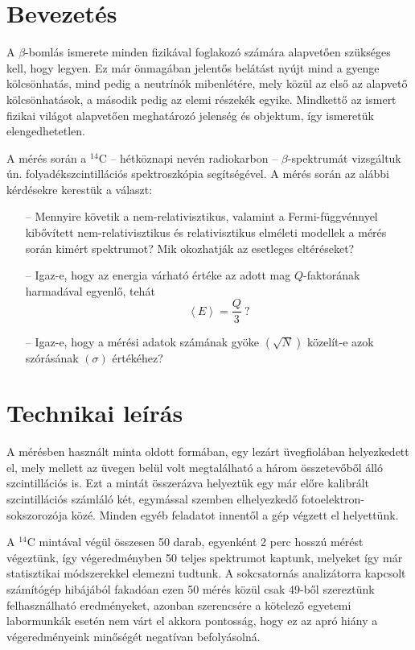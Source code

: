 \begin{multicols}{2}
\section{Bevezetés}
A $\beta$-bomlás ismerete minden fizikával foglakozó számára alapvetően szükséges kell, hogy legyen. Ez már önmagában jelentős belátást nyújt mind a gyenge kölcsönhatás, mind pedig a neutrínók mibenlétére, mely közül az első az alapvető kölcsönhatások, a második pedig az elemi részekék egyike. Mindkettő az ismert fizikai világot alapvetően meghatározó jelenség és objektum, így ismeretük elengedhetetlen. \par
A mérés során a $^{14}$C -- hétköznapi nevén radiokarbon -- $\beta$-spektrumát vizsgáltuk ún. folyadékszcintillációs spektroszkópia segítségével. A mérés során az alábbi kérdésekre kerestük a választ:
\begin{itemize}
\item[--] Mennyire követik a nem-relativisztikus, valamint a Fermi-függvénnyel kibővített nem-relativisztikus és relativisztikus elméleti modellek a mérés során kimért spektrumot? Mik okozhatják az esetleges eltéréseket?
\item[--] Igaz-e, hogy az energia várható értéke az adott mag $Q$-faktorának harmadával egyenlő, tehát
	\begin{equation*}
	\left< E \right> = \frac{Q}{3}\ \text{?}
	\end{equation*}
\item[--] Igaz-e, hogy a mérési adatok számának gyöke $\left( \sqrt{N} \right)$ közelít-e azok szórásának $\left( \sigma \right)$ értékéhez?
\end{itemize}

\section{Technikai leírás}
A mérésben használt minta oldott formában, egy lezárt üvegfiolában helyezkedett el, mely mellett az üvegen belül volt megtalálható a három összetevőből álló szcintillációs  is. Ezt a mintát összerázva helyeztük egy már előre kalibrált szcintillációs számláló két, egymással szemben elhelyezkedő fotoelektron-sokszorozója közé. Minden egyéb feladatot innentől a gép végzett el helyettünk. \par
A $^{14}$C mintával végül összesen 50 darab, egyenként 2 perc hosszú mérést végeztünk, így végeredményben 50 teljes spektrumot kaptunk, melyeket így már statisztikai módszerekkel elemezni tudtunk. A sokcsatornás analizátorra kapcsolt számítógép hibájából fakadóan ezen 50 mérés közül csak 49-ből szereztünk felhasználható eredményeket, azonban szerencsére a kötelező egyetemi labormunkák esetén nem várt el akkora pontosság, hogy ez az apró hiány a végeredményeink minőségét negatívan befolyásolná.


\end{multicols}
